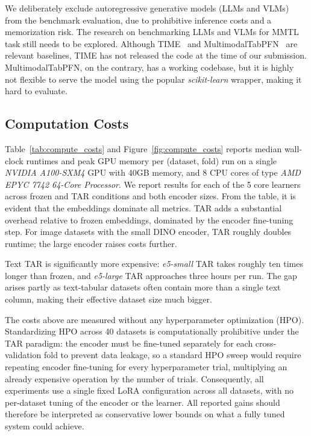 \documentclass{llmxive}
\begin{document}
We deliberately exclude autoregressive generative models (LLMs and VLMs) from the benchmark evaluation, due to prohibitive inference costs and a memorization risk. The research on benchmarking LLMs and VLMs for MMTL task still needs to be explored. Although TIME~\cite{luo_time_2025} and MultimodalTabPFN~\cite{kim_multimodalpfn_2025} are relevant baselines, TIME has not released the code at the time of our submission. MultimodalTabPFN, on the contrary, has a working codebase, but it is highly not flexible to serve the model using the popular \textit{scikit-learn} \cite{pedregosa2011scikit} wrapper, making it hard to evaluate.

\subsection{Computation Costs}\label{tab:costs}

Table~\ref{tab:compute_costs} and Figure~\ref{fig:compute_costs} reports median wall-clock runtimes and peak GPU memory per (dataset, fold) run on a single \textit{NVIDIA A100-SXM4} GPU with 40GB memory,
and 8 CPU cores of type \textit{AMD EPYC 7742 64-Core Processor}. We report results for each of the 5 core learners across frozen and TAR conditions and both encoder sizes. From the table, it is evident that the embeddings dominate all metrics. TAR adds a substantial overhead relative to frozen embeddings, dominated by the encoder fine-tuning step. For image datasets with the small DINO encoder, TAR roughly doubles runtime; the large encoder raises costs further.

Text TAR is significantly more expensive: \textit{e5-small} TAR takes roughly ten times longer than frozen, and \textit{e5-large} TAR approaches three hours per run. The gap arises partly as text-tabular datasets often contain more than a single text column, making their effective dataset size much bigger.

The costs above are measured without any hyperparameter optimization (HPO).
Standardizing HPO across 40 datasets is computationally prohibitive under the TAR paradigm: the encoder must be fine-tuned separately for each cross-validation fold to prevent data leakage, so a standard HPO sweep would require repeating encoder fine-tuning for every hyperparameter trial, multiplying an already expensive operation by the number of trials.
Consequently, all experiments use a single fixed LoRA configuration across all datasets, with no per-dataset tuning of the encoder or the learner.
All reported gains should therefore be interpreted as conservative lower bounds on what a fully tuned system could achieve. 
\end{document}
